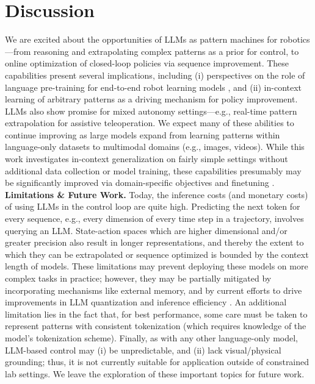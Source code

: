 \documentclass{article}
\newcommand{\eg}{e.g., }
\begin{document}
\section{Discussion}
\label{sec:discussion_and_limitations}
We are excited about the opportunities of LLMs as pattern machines for robotics---from reasoning and extrapolating complex patterns as a prior for control, to online optimization of closed-loop policies via sequence improvement. These capabilities present several implications, including (i) perspectives on the role of language pre-training for end-to-end robot learning models \cite{lu2021pretrained,reid2022can}, and (ii) in-context learning of arbitrary patterns as a driving mechanism for policy improvement. LLMs also show promise for mixed autonomy settings---\eg real-time pattern extrapolation for assistive teleoperation. We expect many of these abilities to continue improving as large models expand from learning  patterns within language-only datasets to multimodal domains (\eg images, videos). While this work investigates in-context generalization on fairly simple settings without additional data collection or model training, these capabilities presumably may be significantly improved via domain-specific objectives and finetuning \cite{li2022pre,driess2023palm,zhang2023motiongpt,lee2023supervised, dinh2022lift}.
\textbf{Limitations \& Future Work.} Today, the inference costs (and monetary costs) of using LLMs in the control loop are quite high. Predicting the next token for every sequence, \eg every dimension of every time step in a trajectory, involves querying an LLM. State-action spaces which are higher dimensional and/or greater precision also result in longer  representations, and thereby the extent to which they can be extrapolated or sequence optimized is bounded by the context length of models. These limitations may prevent deploying these models on more complex tasks in practice; however, they may be partially mitigated by incorporating mechanisms like external memory, and by current efforts to drive improvements in LLM quantization \cite{zafrir2019q8bert} and inference efficiency \cite{dao2022flashattention}. An additional limitation lies in the fact that, for best performance, some care must be taken to represent patterns with consistent tokenization (which requires knowledge of the model's tokenization scheme). Finally, as with any other language-only model, LLM-based control may (i) be unpredictable, and (ii) lack visual/physical grounding; thus, it is not currently suitable for application outside of constrained lab settings. We leave the exploration of these important topics for future work.
\small

\normalsize
\clearpage
\appendix
\end{document}
